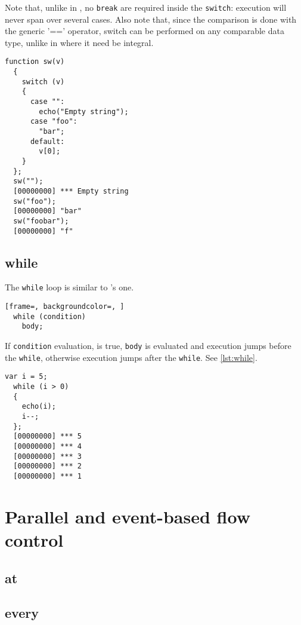 \documentclass[openright,twoside,12pt]{report}
\begin{document}
Note that, unlike in \C, no \lstinline|break| are required inside the
\lstinline|switch|: execution will never span over several cases. Also
note that, since the comparison is done with the generic '=='
operator, switch can be performed on any comparable data type, unlike
in \C where it need be integral.

\begin{lstlisting}[caption=The \lstinline|switch| construct,
  label=lst:switch, float=\floatpos]
  function sw(v)
  {
    switch (v)
    {
      case "":
        echo("Empty string");
      case "foo":
        "bar";
      default:
        v[0];
    }
  };
  sw("");
  [00000000] *** Empty string
  sw("foo");
  [00000000] "bar"
  sw("foobar");
  [00000000] "f"
\end{lstlisting}

\subsection{while}

The \lstinline|while| loop is similar to \C's one.

\begin{lstlisting}[frame=, backgroundcolor=, ]
  while (condition)
    body;
\end{lstlisting}

If \lstinline|condition| evaluation, is true, \lstinline|body| is
evaluated and execution jumps before the \lstinline|while|, otherwise execution
jumps after the \lstinline|while|. See \autoref{lst:while}.

\begin{lstlisting}[caption=The \lstinline|while| construct, label=lst:while,
  float=\floatpos]
  var i = 5;
  while (i > 0)
  {
    echo(i);
    i--;
  };
  [00000000] *** 5
  [00000000] *** 4
  [00000000] *** 3
  [00000000] *** 2
  [00000000] *** 1
\end{lstlisting}

\FloatBarrier
\section{Parallel and event-based flow control}

\subsection{at}
\subsection{every}
\end{document}
